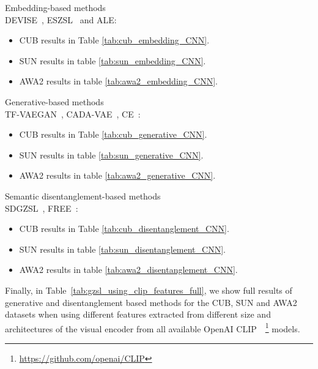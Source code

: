 \vfill\eject
\begin{compactitem}
  \item Embedding-based methods \\DEVISE~\cite{DeViSE}, ESZSL~\cite{ESZSL} and ALE\cite{ALE}:
  \begin{itemize}
    \item CUB results in Table \ref{tab:cub_embedding_CNN}. 
    \item SUN results in table \ref{tab:sun_embedding_CNN}.
    \item AWA2 results in table \ref{tab:awa2_embedding_CNN}. 
  \end{itemize}
  \item Generative-based methods \\TF-VAEGAN~\cite{tfvaegan}, CADA-VAE~\cite{CADA_VAE}, CE~\cite{CE}:
    \begin{itemize}
    \item CUB results in Table \ref{tab:cub_generative_CNN}. 
    \item SUN results in table \ref{tab:sun_generative_CNN}. 
    \item AWA2 results in table \ref{tab:awa2_generative_CNN}. 
  \end{itemize}
  \item Semantic disentanglement-based methods \\SDGZSL~\cite{SDGZSL}, FREE~\cite{Chen2021FREE}:
    \begin{itemize}
        \item CUB results in Table \ref{tab:cub_disentanglement_CNN}. 
        \item SUN results in table \ref{tab:sun_disentanglement_CNN}. 
        \item AWA2 results in table \ref{tab:awa2_disentanglement_CNN}. 
  \end{itemize}
\end{compactitem}





Finally, in Table~\ref{tab:gzsl_using_clip_features_full}, we show full results of generative and disentanglement based methods for the CUB, SUN and AWA2 datasets when using different features extracted from different size and architectures of the visual encoder from all available OpenAI CLIP~\cite{CLIP}~\footnote{\href{https://github.com/openai/CLIP}{https://github.com/openai/CLIP}} models. 





